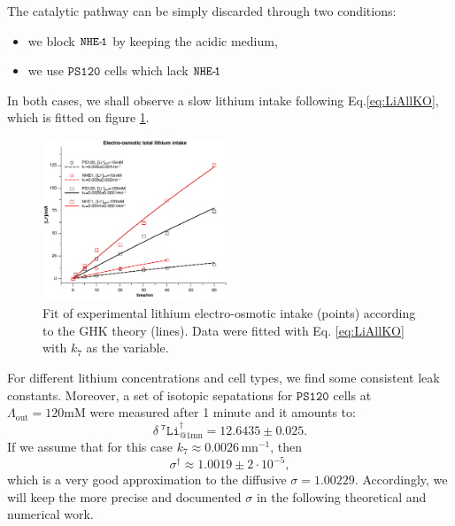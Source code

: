 \documentclass[aps,onecolumn,11pt]{revtex4}
\newcommand{\mychem}[1]{\mathtt{#1}}
\newcommand{\spLi}[1]{{~^{\mychem{#1}}\mychem{Li}}}
\newcommand{\deltaLi}{ {\delta\!\!\!\spLi{7}} }
\newcommand{\LiAll}{\Lambda}
\newcommand{\LiAllOut}{{\LiAll}_{\mathrm{out}}}
\newcommand{\NHE}[1]{\mychem{NHE}{\mychem{\hbox{-}\!#1}}}
\newcommand{\todo}[1]{\framebox{\textbf{\color{WildStrawberry}{#1}}}}
\newcommand{\ko}{\dagger}
\begin{document}
The catalytic pathway can be simply discarded through two conditions:
\begin{itemize}
	\item we block $\NHE{1}$ by keeping the acidic medium,
	\item we use   $\mychem{PS120}$ cells which lack $\NHE{1}$
\end{itemize}
In both cases, we shall observe a slow lithium intake following Eq.\eqref{eq:LiAllKO}, which is fitted on figure \ref{fig:leak}.
\begin{figure}[!ht]
\begin{center}
\includegraphics[width=0.5\textwidth]{leaks.pdf}
\end{center}
\caption{\label{fig:leak} Fit of experimental lithium electro-osmotic intake (points) according to the GHK theory (lines). Data were fitted with
Eq. \eqref{eq:LiAllKO} with $k_7$ as the variable.}
\end{figure}
For different lithium concentrations and cell types, we find some consistent leak constants.
Moreover, a set of isotopic sepatations for $\mychem{PS120}$ cells at $\LiAllOut=120\text{mM}$ were measured after 1 minute and it amounts to:
\begin{equation}
\label{eq:d7ps120}
\deltaLi^\ko_{@1\text{mn}} = 12.6435 \pm 0.025.
\end{equation}
If we assume that
for this case $k_7\approx0.0026\,\text{mn}^{-1}$, then
\begin{equation}
	\sigma^\ko \approx 1.0019 \pm 2\cdot10^{-5},
\end{equation}
which is a very good approximation \todo{given the crude assumptions} to the diffusive $\sigma=1.00229$. Accordingly, we will keep the more precise and documented $\sigma$ 
in the following theoretical and numerical work.
\end{document}

